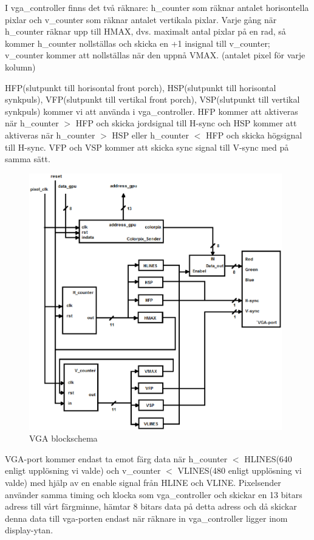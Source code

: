 \documentclass[11pt]{article}
\begin{document}
I vga\_controller finns det två räknare: h\_counter som räknar antalet horisontella pixlar och v\_counter som räknar antalet vertikala pixlar. Varje gång när h\_counter räknar upp till HMAX, dvs. maximalt antal pixlar på en rad, så kommer h\_counter nollställas och skicka en +1 insignal till v\_counter; v\_counter kommer att nollställas när den uppnå VMAX. (antalet pixel för varje kolumn)

HFP(slutpunkt till horisontal front porch), HSP(slutpunkt till horisontal synkpuls), VFP(slutpunkt till vertikal front porch), VSP(slutpunkt till vertikal synkpuls) kommer vi att använda i vga\_controller. HFP kommer att aktiveras när h\_counter $>$ HFP och skicka jordsignal till H-sync och HSP kommer att aktiveras när h\_counter $>$ HSP eller h\_counter $<$ HFP och skicka högsignal till H-sync. VFP och VSP kommer att skicka sync signal till V-sync med på samma sätt.

\begin{figure}[h]
    \begin{center}
        \includegraphics[width=11cm]{vga2.eps}
        \caption{VGA blockschema}
        \label{fig:vga2}
    \end{center}
\end{figure}

\vspace{4cm}

VGA-port kommer endast ta emot färg data när h\_counter $<$ HLINES(640 enligt upplösning vi valde) och v\_counter $<$ VLINES(480 enligt upplösning vi valde) med hjälp av en enable signal från HLINE och VLINE.
Pixelsender använder samma timing och klocka som vga\_controller och skickar en 13 bitars adress till vårt färgminne, hämtar 8 bitars data på detta adress och då skickar denna data till vga-porten endast när räknare in vga\_controller ligger inom display-ytan.
\end{document}
